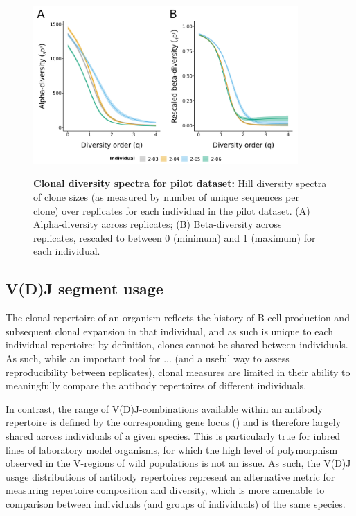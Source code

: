 \begin{figure}
\centering
\includegraphics[width = 0.9\textwidth]{_Figures/png/pilot-clone-diversity}
\begin{subfigure}{0em}
\label{fig:igseq-pilot-clone-diversity-alpha}
\end{subfigure}
\begin{subfigure}{0em}
\label{fig:igseq-pilot-clone-diversity-beta}
\end{subfigure}
\caption{\textbf{Clonal diversity spectra for pilot dataset:} Hill diversity spectra of clone sizes (as measured by number of unique sequences per clone) over replicates for each individual in the pilot dataset. (A) Alpha-diversity across replicates; (B) Beta-diversity across replicates, rescaled to between 0 (minimum) and 1 (maximum) for each individual.}
\label{fig:igseq-pilot-clone-diversity}
\end{figure}

\subsection{V(D)J segment usage}

The clonal repertoire of an organism reflects the history of \naive B-cell production and subsequent clonal expansion in that individual, and as such is unique to each individual repertoire: by definition, clones cannot be shared between individuals. As such, while an important tool for ...
(and a useful way to assess reproducibility between replicates),
clonal measures are limited in their ability to meaningfully compare the antibody repertoires of different individuals. 

In contrast, the range of V(D)J-combinations available within an antibody repertoire is defined by the corresponding gene locus () %
and is therefore largely shared across individuals of a given species. This is particularly true for inbred lines of laboratory model organisms, for which the high level of polymorphism observed in the V-regions of wild populations %
is not an issue. As such, the V(D)J usage distributions of antibody repertoires represent an alternative metric for measuring repertoire composition and diversity, which is more amenable to comparison between individuals (and groups of individuals) of the same species.

